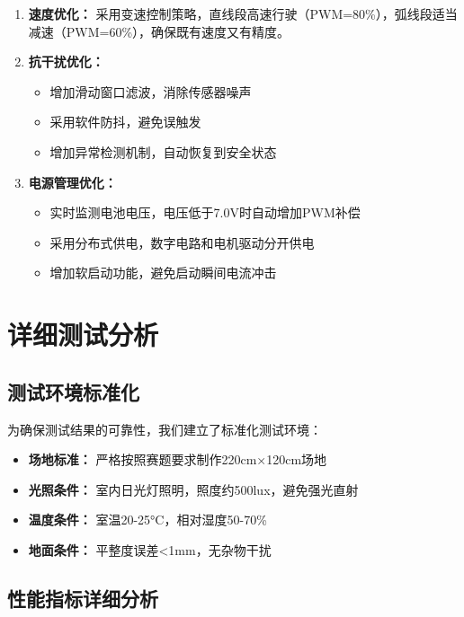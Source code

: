 \documentclass[UTF8]{ctexart}
\begin{document}
\begin{enumerate}
    \item \textbf{速度优化：} 采用变速控制策略，直线段高速行驶（PWM=80\%），弧线段适当减速（PWM=60\%），确保既有速度又有精度。
    
    \item \textbf{抗干扰优化：} 
    \begin{itemize}
        \item 增加滑动窗口滤波，消除传感器噪声
        \item 采用软件防抖，避免误触发
        \item 增加异常检测机制，自动恢复到安全状态
    \end{itemize}
    
    \item \textbf{电源管理优化：} 
    \begin{itemize}
        \item 实时监测电池电压，电压低于7.0V时自动增加PWM补偿
        \item 采用分布式供电，数字电路和电机驱动分开供电
        \item 增加软启动功能，避免启动瞬间电流冲击
    \end{itemize}
\end{enumerate}

\section{详细测试分析}

\subsection{测试环境标准化}

为确保测试结果的可靠性，我们建立了标准化测试环境：

\begin{itemize}
    \item \textbf{场地标准：} 严格按照赛题要求制作220cm×120cm场地
    \item \textbf{光照条件：} 室内日光灯照明，照度约500lux，避免强光直射
    \item \textbf{温度条件：} 室温20-25°C，相对湿度50-70\%
    \item \textbf{地面条件：} 平整度误差<1mm，无杂物干扰
\end{itemize}

\subsection{性能指标详细分析}
\end{document}
